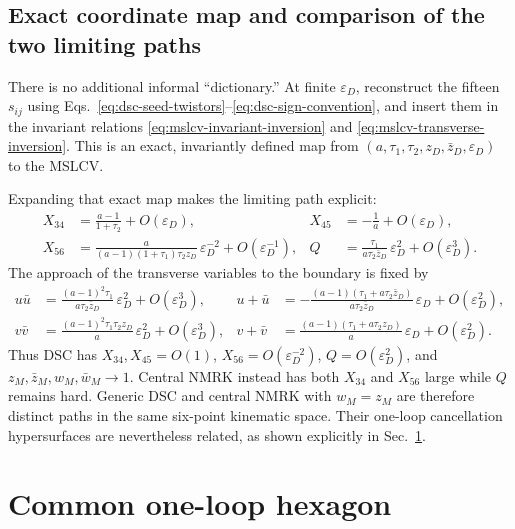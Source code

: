 \documentclass[11pt]{article}
\begin{document}
\subsection{Exact coordinate map and comparison of the two limiting paths}

There is no additional informal ``dictionary.''  At finite
\(\varepsilon_D\), reconstruct the fifteen \(s_{ij}\) using
Eqs.~\eqref{eq:dsc-seed-twistors}--\eqref{eq:dsc-sign-convention}, and insert
them in the invariant relations \eqref{eq:mslcv-invariant-inversion} and
\eqref{eq:mslcv-transverse-inversion}.  This is an exact, invariantly defined
map from \((a,\tau_1,\tau_2,z_D,\bar z_D,\varepsilon_D)\) to the MSLCV.

Expanding that exact map makes the limiting path explicit:
\begin{align}
X_{34}&=\frac{a-1}{1+\tau_2}+O(\varepsilon_D),&
X_{45}&=-\frac1a+O(\varepsilon_D),\nonumber\\
X_{56}&=\frac{a}{(a-1)(1+\tau_1)\tau_2z_D}\,
 \varepsilon_D^{-2}+O(\varepsilon_D^{-1}),&
Q&=\frac{\tau_1}{a\tau_2\bar z_D}\,
 \varepsilon_D^2+O(\varepsilon_D^3).
\label{eq:dsc-to-mslcv-longitudinal}
\end{align}
The approach of the transverse variables to the boundary is fixed by
\begin{align}
u\bar u&=\frac{(a-1)^2\tau_1}{a\tau_2\bar z_D}\,
 \varepsilon_D^2+O(\varepsilon_D^3),&
u+\bar u&=-\frac{(a-1)(\tau_1+a\tau_2\bar z_D)}
 {a\tau_2\bar z_D}\,\varepsilon_D+O(\varepsilon_D^2),\nonumber\\
v\bar v&=\frac{(a-1)^2\tau_1\tau_2z_D}{a}\,
 \varepsilon_D^2+O(\varepsilon_D^3),&
v+\bar v&=\frac{(a-1)(\tau_1+a\tau_2z_D)}{a}\,
 \varepsilon_D+O(\varepsilon_D^2).
\label{eq:dsc-to-mslcv-transverse}
\end{align}
Thus DSC has \(X_{34},X_{45}=O(1)\),
\(X_{56}=O(\varepsilon_D^{-2})\), \(Q=O(\varepsilon_D^2)\), and
\(z_M,\bar z_M,w_M,\bar w_M\to1\).  Central NMRK instead has both
\(X_{34}\) and \(X_{56}\) large while \(Q\) remains hard.  Generic DSC and
central NMRK with \(w_M=z_M\) are therefore distinct paths in the same
six-point kinematic space.  Their one-loop cancellation hypersurfaces are
nevertheless related, as shown explicitly in Sec.~\ref{sec:one-loop-common}.

\section{Common one-loop hexagon}
\label{sec:one-loop-common}
\end{document}
